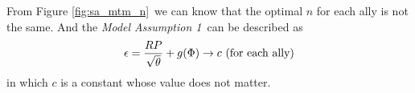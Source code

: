 From Figure \ref{fig:sa_mtm_n}\ we can know that the optimal $n$ for each ally is not the same. And the \textsl{Model Assumption 1}\ can be described as
\begin{equation}
\epsilon = \frac{RP}{\sqrt{\theta}} + g(\Phi) \to c\ \textup{(for each ally)}
\label{eq:I_theta_relationship}
\end{equation}
in which $c$ is a constant whose value does not matter.